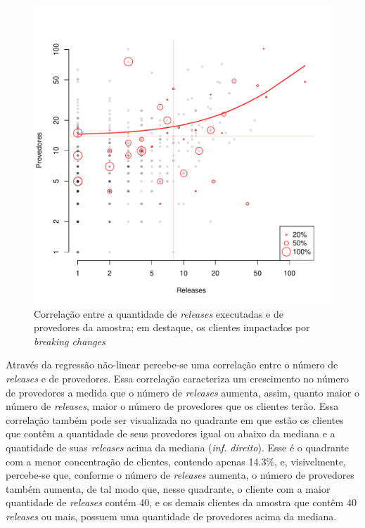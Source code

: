 \begin{figure}
    \centering
    \includegraphics[scale=0.5]{figuras/result_rq1_releases_affecteds.pdf}
    \caption{Correlação entre a quantidade de \textit{releases} executadas e de provedores da amostra; em destaque, os clientes impactados por \textit{breaking changes}}
    \label{fig:result_rq1_releases_affecteds}
\end{figure}{}

Através da regressão não-linear percebe-se uma correlação entre o número de \textit{releases} e de provedores. Essa correlação caracteriza um crescimento no número de provedores a medida que o número de \textit{releases} aumenta, assim, quanto maior o número de \textit{releases}, maior o número de provedores que os clientes terão. Essa correlação também pode ser visualizada no quadrante em que estão os clientes que contêm a quantidade de seus provedores igual ou abaixo da mediana e a quantidade de suas \textit{releases} acima da mediana (\textit{inf. direito}). Esse é o quadrante com a menor concentração de clientes, contendo apenas 14.3\%, e, visivelmente, percebe-se que, conforme o número de \textit{releases} aumenta, o número de provedores também aumenta, de tal modo que, nesse quadrante, o cliente com a maior quantidade de \textit{releases} contém 40, e os demais clientes da amostra que contêm 40 \textit{releases} ou mais, possuem uma quantidade de provedores acima da mediana.


